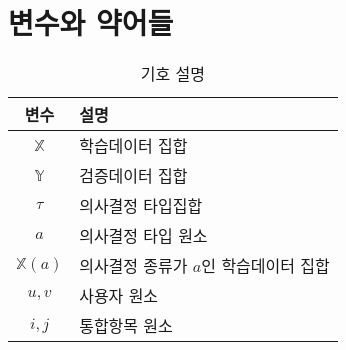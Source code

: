 \section{변수와 약어들}

\begin{table}[h]
\caption{기호 설명}
\centering
\begin{tabular}{cl}
\hline
변수 & 설명 \\
\hline
\hline
$\mathbb{X}$ & 학습데이터 집합 \\
$\mathbb{Y}$ & 검증데이터 집합 \\
$\tau$ & 의사결정 타입집합  \\
$a$ & 의사결정 타입 원소 \\
$\mathbb{X}(a)$ & 의사결정 종류가 $a$인 학습데이터 집합 \\
$u, v$ & 사용자 원소 \\
$i, j$ & 통합항목 원소 \\
\hline
\end{tabular}
\end{table}